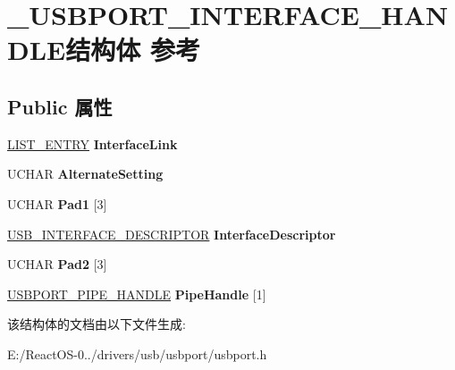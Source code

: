\hypertarget{struct___u_s_b_p_o_r_t___i_n_t_e_r_f_a_c_e___h_a_n_d_l_e}{}\section{\+\_\+\+U\+S\+B\+P\+O\+R\+T\+\_\+\+I\+N\+T\+E\+R\+F\+A\+C\+E\+\_\+\+H\+A\+N\+D\+L\+E结构体 参考}
\label{struct___u_s_b_p_o_r_t___i_n_t_e_r_f_a_c_e___h_a_n_d_l_e}
\subsection*{Public 属性}
\begin{DoxyCompactItemize}
\item 
\mbox{\label{struct___u_s_b_p_o_r_t___i_n_t_e_r_f_a_c_e___h_a_n_d_l_e_a4a6b2847bd92a62010e67f9370e34fc8}} 
\hyperlink{struct___l_i_s_t___e_n_t_r_y}{L\+I\+S\+T\+\_\+\+E\+N\+T\+RY} {\bfseries Interface\+Link}
\item 
\mbox{\label{struct___u_s_b_p_o_r_t___i_n_t_e_r_f_a_c_e___h_a_n_d_l_e_a0375a80e75bb5b30faf6d5cc61533fa3}} 
U\+C\+H\+AR {\bfseries Alternate\+Setting}
\item 
\mbox{\label{struct___u_s_b_p_o_r_t___i_n_t_e_r_f_a_c_e___h_a_n_d_l_e_a805664ab0988ddfa17ecf5abb154ebf3}} 
U\+C\+H\+AR {\bfseries Pad1} \mbox{[}3\mbox{]}
\item 
\mbox{\label{struct___u_s_b_p_o_r_t___i_n_t_e_r_f_a_c_e___h_a_n_d_l_e_a5d95d73ca644914808696e6a8c47fce3}} 
\hyperlink{struct___u_s_b___i_n_t_e_r_f_a_c_e___d_e_s_c_r_i_p_t_o_r}{U\+S\+B\+\_\+\+I\+N\+T\+E\+R\+F\+A\+C\+E\+\_\+\+D\+E\+S\+C\+R\+I\+P\+T\+OR} {\bfseries Interface\+Descriptor}
\item 
\mbox{\label{struct___u_s_b_p_o_r_t___i_n_t_e_r_f_a_c_e___h_a_n_d_l_e_a4a48ccfa2c228ef0b38fbc64b3610f55}} 
U\+C\+H\+AR {\bfseries Pad2} \mbox{[}3\mbox{]}
\item 
\mbox{\label{struct___u_s_b_p_o_r_t___i_n_t_e_r_f_a_c_e___h_a_n_d_l_e_a2492f4b35846f6809db65f8cb41e93ae}} 
\hyperlink{struct___u_s_b_p_o_r_t___p_i_p_e___h_a_n_d_l_e}{U\+S\+B\+P\+O\+R\+T\+\_\+\+P\+I\+P\+E\+\_\+\+H\+A\+N\+D\+LE} {\bfseries Pipe\+Handle} \mbox{[}1\mbox{]}
\end{DoxyCompactItemize}


该结构体的文档由以下文件生成\+:\begin{DoxyCompactItemize}
\item 
E\+:/\+React\+O\+S-\/0../drivers/usb/usbport/usbport.\+h\end{DoxyCompactItemize}
